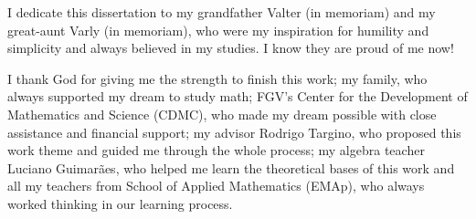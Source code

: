 \newpage

\begin{dedicatoria}
    \vspace*{\fill}
    \hfill
    \begin{minipage}{.6\textwidth}
        I dedicate this dissertation to my grandfather Valter (in memoriam) and my great-aunt Varly (in memoriam), who were my inspiration for humility and simplicity and always believed in my studies. I know they are proud of me now!
    \end{minipage}
\end{dedicatoria}
 
\begin{agradecimentos}
	I thank God for giving me the strength to finish this work; my family, who always supported my dream to study math; FGV's Center for the Development of Mathematics and Science (CDMC), who made my dream possible with close assistance and financial support; my advisor Rodrigo Targino, who proposed this work theme and guided me through the whole process; my algebra teacher Luciano Guimarães, who helped me learn the theoretical bases of this work and all my teachers from School of Applied Mathematics (EMAp), who always worked thinking in our learning process.
\end{agradecimentos}


